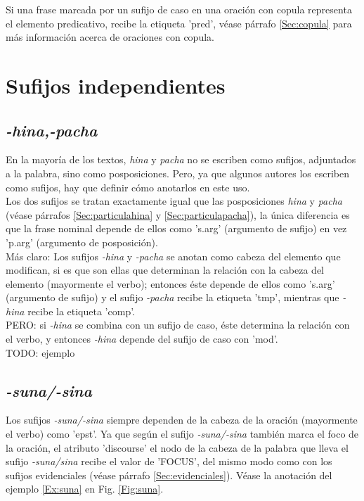 \documentclass[a4paper,11pt,DIV12]{scrartcl}
\begin{document}
Si una frase marcada por un sufijo de caso en una oraci\'on con copula representa el elemento predicativo, recibe la etiqueta 'pred', v\'ease p\'arrafo \ref{Sec:copula} para m\'as informaci\'on acerca de oraciones con copula.




\section{Sufijos independientes}
 \subsection{{\em -hina,-pacha}}\label{Sec:hinapachasufijos}
En la mayor\'ia de los textos, {\em hina} y {\em pacha} no se escriben como sufijos, adjuntados a la palabra, sino como posposiciones. Pero, ya que algunos autores los escriben como sufijos, hay que definir c\'omo anotarlos en este uso.\\
Los dos sufijos se tratan exactamente igual que las posposiciones {\em hina} y {\em pacha} (v\'ease p\'arrafos \ref{Sec:particulahina} y \ref{Sec:particulapacha}), la \'unica diferencia es que la frase nominal depende de ellos como 's.arg' (argumento de sufijo) en vez 'p.arg' (argumento de posposici\'on).\\ M\'as claro:
 Los sufijos {\em -hina} y {\em -pacha} se anotan como cabeza del elemento que modifican, si es que son ellas que determinan la relaci\'on con la cabeza del elemento (mayormente el verbo);  entonces \'este depende de ellos como 's.arg' (argumento de sufijo) y el sufijo {\em -pacha} recibe la etiqueta 'tmp', mientras que {\em -hina} recibe la etiqueta 'comp'.\\
 PERO: si {\em-hina} se combina con un sufijo de caso, \'este determina la relaci\'on con el verbo, y entonces {\em -hina} depende del sufijo de caso con 'mod'.\\
 TODO: ejemplo





\subsection{{\em -suna/-sina}}
Los sufijos {\em -suna/-sina} siempre dependen de la cabeza de la oraci\'on (mayormente el verbo) como 'epst'. Ya que seg\'un \citeauthor{Cusi2} el sufijo {\em -suna/-sina} tambi\'en marca el foco de la oraci\'on, el atributo 'discourse' el nodo de la cabeza de la palabra que lleva el sufijo {\em -suna/sina} recibe el valor de 'FOCUS', del mismo modo como con los sufijos evidenciales (v\'ease p\'arrafo \ref{Sec:evidenciales}). V\'ease la anotaci\'on del ejemplo \ref{Ex:suna} en Fig. \ref{Fig:suna}.
\end{document}
